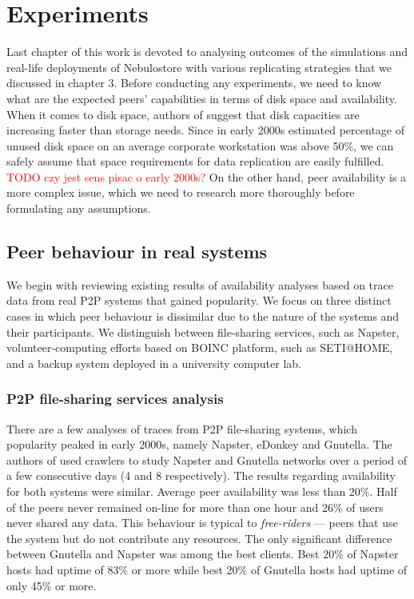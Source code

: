 \documentclass{pracamgren}
\begin{document}
%
%
%
%

\chapter{Experiments}\label{chap:experiments}

Last chapter of this work is devoted to analysing outcomes of the simulations and real-life deployments of Nebulostore with various replicating strategies that we discussed in chapter 3.
Before conducting any experiments, we need to know what are the expected peers' capabilities in terms of disk space and availability. When it comes to disk space, authors of \cite{farsite} suggest that disk capacities are increasing faster than storage needs. Since in early 2000s estimated percentage of unused disk space on an average corporate workstation was above 50\%, we can safely assume that space requirements for data replication are easily fulfilled. \textcolor{red}{TODO czy jest sens pisac o early 2000s?}
On the other hand, peer availability is a more complex issue, which we need to research more thoroughly before formulating any assumptions. \\

\section{Peer behaviour in real systems}

We begin with reviewing existing results of availability analyses based on trace data from real P2P systems that gained popularity. We focus on three distinct cases in which peer behaviour is dissimilar due to the nature of the systems and their participants. We distinguish between file-sharing services, such as Napster, volunteer-computing efforts based on BOINC platform, such as SETI@HOME, and a backup system deployed in a university computer lab.\\

\subsection{P2P file-sharing services analysis}

There are a few analyses of traces from P2P file-sharing systems, which popularity peaked in early 2000s, namely Napster, eDonkey and Gnutella. The authors of \cite{napster} used crawlers to study Napster and Gnutella networks over a period of a few consecutive days (4 and 8 respectively). The results regarding availability for both systems were similar. Average peer availability was less than 20\%. Half of the peers never remained on-line for more than one hour and 26\% of users never shared any data. This behaviour is typical to {\it free-riders} --- peers that use the system but do not contribute any resources. The only significant difference between Gnutella and Napster was among the best clients. Best 20\% of Napster hosts had uptime of 83\% or more while best 20\% of Gnutella hosts had uptime of only 45\% or more.\\
\end{document}
